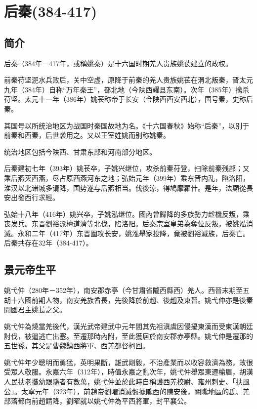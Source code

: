 

\section{后秦\tiny(384-417)}

\subsection{简介}

后秦（384年－417年，或稱姚秦）是十六国时期羌人贵族姚苌建立的政权。

前秦苻坚淝水兵败后，关中空虚，原降于前秦的羌人贵族姚苌在渭北叛秦，晋太元九年（384年）自称“万年秦王”，都北地（今陕西耀县东南）。次年（385年）擒杀苻坚。太元十一年（386年）姚苌称帝于长安（今陕西西安西北），国号秦，史称后秦。

其国号以所统治地区为战国时秦国故地为名。《十六国春秋》始称“后秦”，以别于前秦和西秦，后世袭用之。又以王室姓姚而别称姚秦。

统治地区包括今陕西、甘肃东部和河南部分地区。

后秦建初七年（393年）姚苌卒，子姚兴继位，攻杀前秦苻登，扫除前秦残部；又乘后燕灭西燕，尽占原西燕河东之地；弘始元年（399年）乘东晋内乱，陷洛阳，淮汉以北诸城多请降，国势遂与后燕相当。伐後涼，得鳩摩羅什。是年，法顯從長安出發西行求經。

弘始十八年（416年）姚兴卒，子姚泓继位。國內曾歸降的多族勢力趁機反叛，乘丧发兵。东晋劉裕派檀道濟等北伐，陷洛阳。后秦宗室皇弟為奪位反叛，被姚泓消滅。永和二年（417年）东晋圍攻长安，姚泓舉家投降，竟被劉裕滅族，后秦亡。后秦共存在32年（384-417）。

\subsection{景元帝生平}

姚弋仲（280年－352年），南安郡赤亭（今甘肅省隴西縣西）羌人。西晉末期至五胡十六國前期人物，南安羌族酋長，先後降於前趙、後趙及東晉。姚弋仲亦是後秦開國君主姚萇之父。

姚弋仲為燒當羌後代，漢光武帝建武中元年間其先祖滇虞因侵擾東漢而受東漢朝廷討伐，被逼逃亡出塞。至遷那時內附，至此獲居於南安郡赤亭縣。姚弋仲是遷那的五世孫，其父是曹魏鎮西將軍、西羌都督柯回。

姚弋仲年少聰明而勇猛，英明果斷，雄武剛毅，不治產業而以收容救濟為務，故很受眾人敬服。永嘉六年（312年），時值永嘉之亂次年，姚弋仲舉眾東遷榆眉，胡漢人民扶老攜幼跟隨者有數萬，姚弋仲並於此時自稱護西羌校尉、雍州刺史、「扶風公」。太寧元年（323年），前趙帝劉曜消滅盤據隴西的陳安後，關隴地區的氐、羌部落都向前趙請降，劉曜就以姚弋仲為平西將軍，封平襄公。

